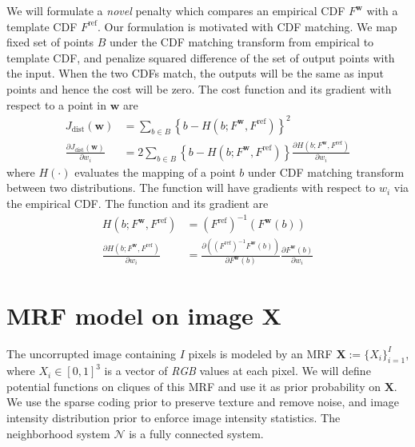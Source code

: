 We will formulate a \emph{novel} penalty which compares an empirical CDF $F^\mathbf{w}$ with a template CDF $F^\text{ref}$. Our formulation is motivated with CDF matching. We map fixed set of points $B$ under the CDF matching transform from empirical to template CDF, and penalize squared difference of the set of output points with the input. When the two CDFs match, the outputs will be the same as input points and hence the cost will be zero. The cost function and its gradient with respect to a point in $\mathbf{w}$ are
\begin{align}
    J_\text{dist} (\mathbf{w}) &= \sum_{b \in B} \left\lbrace b - H \left( b; F^\mathbf{w}, F^\text{ref} \right) \right\rbrace^2 \label{eqn:kdecost} \\
    \frac{ \partial J_\text{dist} (\mathbf{w})} { \partial w_i} &= 2 \sum_{b \in B} \left\lbrace b - H \left( b; F^\mathbf{w}, F^\text{ref} \right) \right\rbrace \frac{\partial H \left( b; F^\mathbf{w}, F^\text{ref} \right)}{\partial w_i}
\end{align}
where $H \left( \cdot \right)$ evaluates the mapping of a point $b$ under CDF matching transform between two distributions. The function will have gradients with respect to $w_i$ via the empirical CDF. The function and its gradient are
\begin{align}
    H \left( b; F^\mathbf{w}, F^\text{ref} \right) &= \left( F^\text{ref}\right)^{-1} \left( F^\mathbf{w} \left(b \right) \right) \label{eqn:cdfinv} \\
    \frac{\partial H \left( b; F^\mathbf{w}, F^\text{ref} \right)}{\partial w_i} &= \frac{ \partial \left( \left( F^\text{ref}\right)^{-1} F^\mathbf{w} \left(b\right) \right) } { \partial F^\mathbf{w} \left( b \right) } \frac{ \partial F^\mathbf{w} \left( b \right)} { \partial w_i}
\end{align}

\section{MRF model on image $\mathbf{X}$}
\label{sec:modelX}

The uncorrupted image containing $I$ pixels is modeled by an MRF $\mathbf{X} := \lbrace X_i \rbrace_{i=1}^{I}$, where $X_i \in \left[0, 1\right]^3$ is a vector of \emph{RGB} values at each pixel. We will define potential functions on cliques of this MRF and use it as prior probability on $\mathbf{X}$. We use the sparse coding prior to preserve texture and remove noise, and image intensity distribution prior to enforce image intensity statistics. The neighborhood system $\mathcal{N}$ is a fully connected system.


